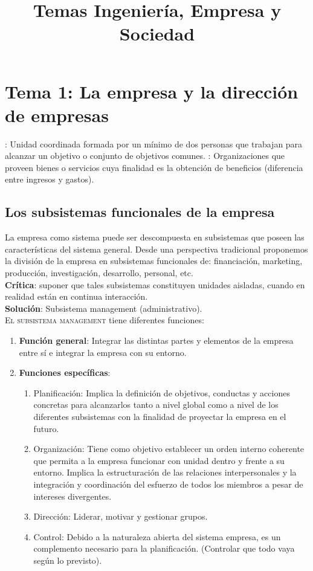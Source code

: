 \documentclass[12pt]{article}
\title{Temas Ingeniería, Empresa y Sociedad}
\author{ }
\theoremstyle{definition_wo_parentheses}
\begin{document}
\maketitle

\section{Tema 1: La empresa y la dirección de empresas}
: Unidad coordinada formada por un mínimo de dos personas que trabajan para alcanzar un objetivo o conjunto de objetivos comunes.
: Organizaciones que proveen bienes o servicios cuya finalidad es la obtención de beneficios (diferencia entre ingresos y gastos).

\subsection{Los subsistemas funcionales de la empresa}
La empresa como sistema puede ser descompuesta en subsistemas que poseen las características del sistema general. Desde una perspectiva tradicional proponemos la división de la empresa en subsistemas funcionales de: financiación, marketing, producción, investigación, desarrollo, personal, etc.\\
\textbf{Crítica}: suponer que tales subsistemas constituyen unidades aisladas, cuando en realidad están en continua interacción.\\
\textbf{Solución}: Subsistema management (administrativo).\\

\textsc{El subsistema management} tiene diferentes funciones:
\begin{enumerate}
\item \textbf{Función general}: Integrar las distintas partes y elementos de la empresa entre sí e integrar la empresa con su entorno.
\item \textbf{Funciones específicas}:
\begin{enumerate}
\item Planificación: Implica la definición de objetivos, conductas y acciones concretas para alcanzarlos tanto a nivel global como a nivel de los diferentes subsistemas con la finalidad de proyectar la empresa en el futuro.
\item Organización: Tiene como objetivo establecer un orden interno coherente que permita a la empresa funcionar con unidad dentro y frente a su entorno. Implica la estructuración de las relaciones interpersonales y la integración y coordinación del esfuerzo de todos los miembros a pesar de intereses divergentes.
\item Dirección: Liderar, motivar y gestionar grupos.
\item Control: Debido a la naturaleza abierta del sistema empresa, es un complemento necesario para la planificación. (Controlar que todo vaya según lo previsto).
\end{enumerate}
\end{enumerate}
\end{document}
